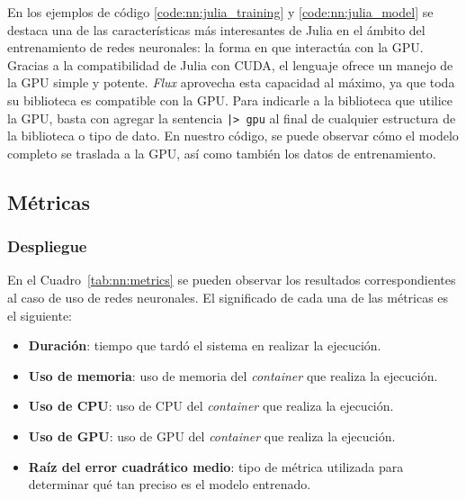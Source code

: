 \documentclass[11pt]{article}
\let\Oldsubsection\subsection
\renewcommand{\subsection}{\FloatBarrier\Oldsubsection}
\let\Oldsubsubsection\subsubsection
\renewcommand{\subsubsection}{\FloatBarrier\Oldsubsubsection}
\newcommand{\english}[1]{\textit{#1}}
\begin{document}
En los ejemplos de código \ref{code:nn:julia_training} y \ref{code:nn:julia_model} se destaca una de las características más interesantes de Julia en el ámbito del entrenamiento de redes neuronales: la forma en que interactúa con la GPU. Gracias a la compatibilidad de Julia con CUDA, el lenguaje ofrece un manejo de la GPU simple y potente. \textit{Flux} aprovecha esta capacidad al máximo, ya que toda su biblioteca es compatible con la GPU. Para indicarle a la biblioteca que utilice la GPU, basta con agregar la sentencia \lstinline{|> gpu} al final de cualquier estructura de la biblioteca o tipo de dato. En nuestro código, se puede observar cómo el modelo completo se traslada a la GPU, así como también los datos de entrenamiento.

\subsection{Métricas}

\subsubsection{Despliegue}

En el Cuadro~\ref{tab:nn:metrics} se pueden observar los resultados correspondientes al caso de uso de redes neuronales. El significado de cada una de las métricas es el siguiente:

\begin{itemize}
    \item \textbf{Duración}: tiempo que tardó el sistema en realizar la ejecución.
    \item \textbf{Uso de memoria}: uso de memoria del \english{container} que realiza la ejecución.
    \item \textbf{Uso de CPU}: uso de CPU del \english{container} que realiza la ejecución.
    \item \textbf{Uso de GPU}: uso de GPU del \english{container} que realiza la ejecución.
    \item \textbf{Raíz del error cuadrático medio}: tipo de métrica utilizada para determinar qué tan preciso es el modelo entrenado.
\end{itemize}
\end{document}
